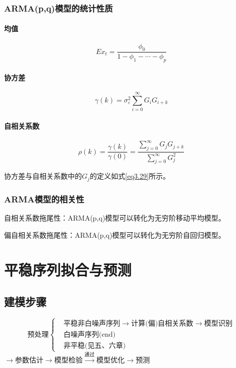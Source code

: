 \documentclass[12pt, a4paper, oneside]{ctexbook}
\begin{document}
\subsection{ARMA(p,q)模型的统计性质}
\subsubsection{均值}
\begin{equation}
    Ex_t=\frac{\phi_0}{1-\phi_1-\cdots-\phi_p}
\end{equation}

\subsubsection{协方差}
\begin{equation}
    \gamma(k)=\sigma_\varepsilon^2\sum_{i=0}^\infty G_iG_{i+k}
\end{equation}

\subsubsection{自相关系数}
\begin{equation}
    \rho(k)=\frac{\gamma(k)}{\gamma(0)}=\frac{\sum_{j=0}^\infty G_jG_{j+k}}{\sum_{j=0}^\infty G_j^2}
\end{equation}

协方差与自相关系数中的$G_j$的定义如式\ref{eq3.29}所示。

\subsection{ARMA模型的相关性}
自相关系数拖尾性：ARMA(p,q)模型可以转化为无穷阶移动平均模型。

偏自相关系数拖尾性：ARMA(p,q)模型可以转化为无穷阶自回归模型。

\chapter{平稳序列拟合与预测}
\section{建模步骤}
\begin{equation*}
    \text{预处理}
    \left\{
    \begin{aligned}
         & \text{平稳非白噪声序列}\rightarrow \text{计算(偏)自相关系数} \rightarrow \text{模型识别} \\
         & \text{白噪声序列(end)}                                                                   \\
         & \text{非平稳(见五、六章)}
    \end{aligned}
    \right.
\end{equation*}
$\rightarrow \text{参数估计} \rightarrow \text{模型检验} \xrightarrow{\text{通过}}
    \text{模型优化} \rightarrow \text{预测}$
\end{document}
